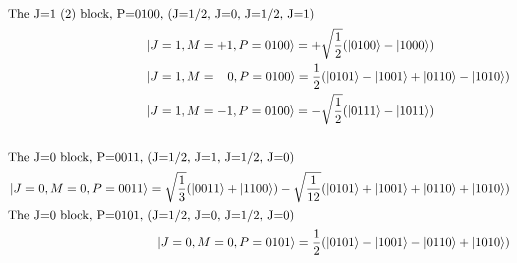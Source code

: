 \begin{subequations}
\begin{align}
\begin{split}
\end{split} \\
\vspace{3pt} \nonumber \\
\intertext{The J=1 (2) block, P=0100, (J=1/2, J=0, J=1/2, J=1)}
\begin{split}
&\ket{J=1, M=+1, P=0100} =+\sqrt{\frac{1}{2}}(\ket{0100}-\ket{1000}) \\
&\ket{J=1, M=\;\;\;0, P=0100} = \frac{1}{2}(\ket{0101}-\ket{1001}+\ket{0110}-\ket{1010}) \\
&\ket{J=1, M=-1, P=0100} =-\sqrt{\frac{1}{2}}(\ket{0111}-\ket{1011})\\ 
\end{split} \\
\vspace{5pt} \nonumber \\
\intertext{The J=0 block, P=0011, (J=1/2, J=1, J=1/2, J=0)}
\begin{split}
&\ket{J=0, M=0, P=0011} = \sqrt{\frac{1}{3}}(\ket{0011}+\ket{1100})-\sqrt{\frac{1}{12}}(\ket{0101}+\ket{1001}+\ket{0110}+\ket{1010}) \\
\end{split} 
\vspace{3pt} \\
\intertext{The J=0 block, P=0101, (J=1/2, J=0, J=1/2, J=0)}
\begin{split}
&\ket{J=0, M=0, P=0101} = \frac{1}{2}(\ket{0101}-\ket{1001}-\ket{0110}+\ket{1010}) \\
\end{split} 
\label{eq:4qubitcg}
\end{align}
\end{subequations}

